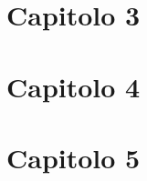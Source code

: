 \def\thesection{2.6}
\begin{esercizi}
	\item
	\item
	\item
	\item
	\item
\end{esercizi}
\def\thesection{2.7}
\begin{esercizi}
	\item
	\item
	\item
	\item
	\item
\end{esercizi}
\def\thesection{2.8}
\begin{esercizi}
	\item
	\item
	\item
	\item
	\item
\end{esercizi}
\section*{Capitolo 3}
\def\thesection{3.1}
\begin{esercizi}
	\item
	\item
	\item
	\item
	\item
\end{esercizi}
\section*{Capitolo 4}
\def\thesection{4.1}
\begin{esercizi}
	\item
	\item
	\item
	\item
	\item
\end{esercizi}
\section*{Capitolo 5}
\def\thesection{5.1}
\begin{esercizi}
	\item
	\item
	\item
	\item
	\item
\end{esercizi}

